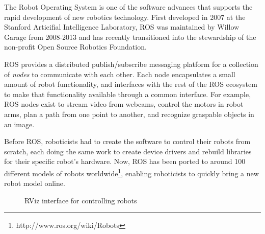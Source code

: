 \documentclass{article}
\begin{document}

The Robot Operating System is one of the software advances that supports the rapid development of new robotics technology.  First developed in 2007 at the Stanford Articifial Intelligence Laboratory, ROS was maintained by Willow Garage from 2008-2013 and has recently transitioned into the stewardship of the non-profit Open Source Robotics Foundation.

ROS provides a distributed publish/subscribe messaging platform for a collection of {\em nodes} to communicate with each other. Each node encapsulates a small amount of robot functionality, and interfaces with the rest of the ROS ecosystem to make that functionality available through a common interface. For example, ROS nodes exist to stream video from webcams, control the motors in robot arms, plan a path from one point to another, and recognize graspable objects in an image.

Before ROS, roboticists had to create the software to control their robots from scratch, each doing the same work to create device drivers and rebuild libraries for their specific robot's hardware.  Now, ROS has been ported to around 100 different models of robots worldwide\footnote{http://www.ros.org/wiki/Robots}, enabling roboticists to quickly bring a new robot model online.

\begin{figure}[tbh]
\caption{RViz interface for controlling robots}
\label{rviz}
\end{figure}
\end{document}
